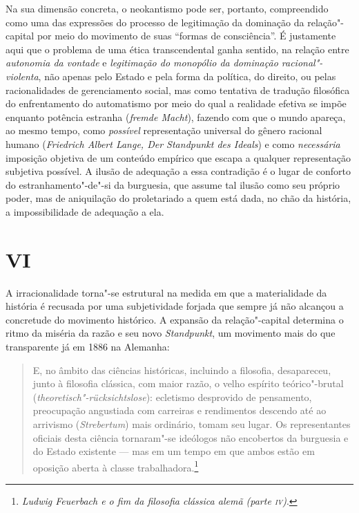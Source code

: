 Na sua dimensão concreta, o neokantismo pode ser, portanto, compreendido
como uma das expressões do processo de legitimação da dominação da
relação"-capital por meio do movimento de suas ``formas de consciência''.
É justamente aqui que o problema de uma ética transcendental ganha
sentido, na relação entre \emph{autonomia da vontade} e
\emph{legitimação do monopólio da dominação racional"-violenta}, não
apenas pelo Estado e pela forma da política, do direito, ou pelas
racionalidades de gerenciamento social, mas como tentativa de tradução
filosófica do enfrentamento do automatismo por meio do qual a realidade
efetiva se impõe enquanto potência estranha (\emph{fremde Macht}),
fazendo com que o mundo apareça, ao mesmo tempo, como \emph{possível}
representação universal do gênero racional humano (\emph{Friedrich
Albert Lange, Der Standpunkt des Ideals}) e como \emph{necessária}
imposição objetiva de um conteúdo empírico que escapa a qualquer
representação subjetiva possível. A ilusão de adequação a essa
contradição é o lugar de conforto do estranhamento"-de"-si da burguesia,
que assume tal ilusão como seu próprio poder, mas de aniquilação do
proletariado a quem está dada, no chão da história, a impossibilidade de
adequação a ela.

\section*{VI}

A irracionalidade torna"-se estrutural na medida em que a materialidade
da história é recusada por uma subjetividade forjada que sempre já não
alcançou a concretude do movimento histórico. A expansão da
relação"-capital determina o ritmo da miséria da razão e seu novo
\emph{Standpunkt}, um movimento mais do que transparente já em 1886 na
Alemanha:

\begin{quote}
E, no âmbito das ciências históricas, incluindo a filosofia,
desapareceu, junto à filosofia clássica, com maior razão, o velho
espírito teórico"-brutal (\emph{theoretisch"-rücksichtslose}): ecletismo
desprovido de pensamento, preocupação angustiada com carreiras e
rendimentos descendo até ao arrivismo (\emph{Strebertum}) mais
ordinário, tomam seu lugar. Os representantes oficiais desta ciência
tornaram"-se ideólogos não encobertos da burguesia e do Estado existente
--- mas em um tempo em que ambos estão em oposição aberta à classe
trabalhadora.\footnote{\emph{Ludwig Feuerbach e o fim da filosofia
  clássica alemã (parte \textsc{iv})}.}
\end{quote}


